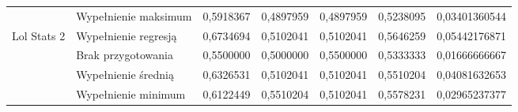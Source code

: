 \documentclass{book}
\begin{document}
\begin{table}[H]
\begin{tabular}{|l|l|r|r|r|r|r|}
                                  & Wypełnienie maksimum & 0,5918367                                                                        & 0,4897959                                                                                & 0,4897959                                                                                          & 0,5238095                                                                       & 0,03401360544                                                                    \\ \cline{2-7} 
    \multirow{-5}{*}{Lol Stats 2} & Wypełnienie regresją & \cellcolor[HTML]{67FD9A}0,6734694                                                & \cellcolor[HTML]{67FD9A}0,5102041                                                        & 0,5102041                                                                                          & 0,5646259                                                                       & 0,05442176871                                                                    \\ \hline
                                  & Brak przygotowania   & 0,5500000                                                                        & 0,5000000                                                                                & 0,5500000                                                                                          & 0,5333333                                                                       & 0,01666666667                                                                    \\ \cline{2-7} 
                                  & Wypełnienie średnią  & 0,6326531                                                                        & 0,5102041                                                                                & 0,5102041                                                                                          & 0,5510204                                                                       & 0,04081632653                                                                    \\ \cline{2-7} 
                                  & Wypełnienie minimum  & 0,6122449                                                                        & \cellcolor[HTML]{67FD9A}0,5510204                                                        & 0,5102041                                                                                          & 0,5578231                                                                       & 0,02965237377                                                                    \\ \cline{2-7} 

\end{tabular}
\end{table}
\end{document}
